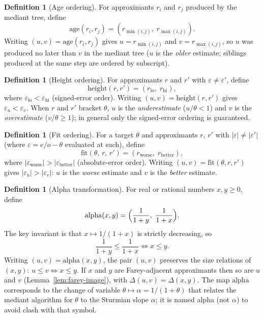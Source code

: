 \documentclass[12pt]{article}
\theoremstyle{definition}
\newtheorem{definition}[theorem]{Definition}
\theoremstyle{remark}
\theoremstyle{plain}
\newcommand{\eps}{\varepsilon}
\begin{document}
\begin{definition}[Age ordering]
\label{def:age}
For approximants $r_i$ and $r_j$ produced by the mediant tree, define
\[
  \mathrm{age}(r_i, r_j) = (r_{\min(i,j)},\; r_{\max(i,j)}).
\]
Writing $(u, v) = \mathrm{age}(r_i, r_j)$ gives $u = r_{\min(i,j)}$ and
$v = r_{\max(i,j)}$, so $u$ was produced no later than $v$ in the mediant tree
($u$ is the \emph{older} estimate; siblings produced at the same step are ordered
by subscript).
\end{definition}

\begin{definition}[Height ordering]
\label{def:height}
For approximants $r$ and $r'$ with $\eps \neq \eps'$, define
\[
  \mathrm{height}(r, r') = (r_{\mathrm{lo}},\; r_{\mathrm{hi}}),
\]
where $\eps_{\mathrm{lo}} < \eps_{\mathrm{hi}}$ (signed-error order).
Writing $(u, v) = \mathrm{height}(r, r')$ gives $\eps_u < \eps_v$.
When $r$ and $r'$ bracket $\theta$, $u$ is the \emph{underestimate}
($u/\theta < 1$) and $v$ is the \emph{overestimate} ($v/\theta \geq 1$);
in general only the signed-error ordering is guaranteed.
\end{definition}

\begin{definition}[Fit ordering]
\label{def:fit}
For a target $\theta$ and approximants $r$, $r'$ with $|\eps| \neq |\eps'|$
(where $\eps = e/o - \theta$ evaluated at each), define
\[
  \mathrm{fit}(\theta,\, r,\, r') = (r_{\mathrm{worse}},\; r_{\mathrm{better}}),
\]
where $|\eps_{\mathrm{worse}}| > |\eps_{\mathrm{better}}|$ (absolute-error order).
Writing $(u, v) = \mathrm{fit}(\theta, r, r')$ gives $|\eps_u| > |\eps_v|$:
$u$ is the \emph{worse} estimate and $v$ is the \emph{better} estimate.
\end{definition}

\begin{definition}[Alpha transformation]
\label{def:alpha-transform}
For real or rational numbers $x, y \geq 0$, define
\[
  \mathrm{alpha}(x, y) = \Bigl(\frac{1}{1+y},\; \frac{1}{1+x}\Bigr).
\]
The key invariant is that $x \mapsto 1/(1+x)$ is strictly decreasing, so
\[
  \frac{1}{1+y} \leq \frac{1}{1+x} \iff x \leq y.
\]
Writing $(u, v) = \mathrm{alpha}(x, y)$, the pair $(u, v)$ preserves the size
relations of $(x, y)$: $u \leq v \iff x \leq y$.
If $x$ and $y$ are Farey-adjacent approximants then so are $u$ and $v$
(Lemma~\ref{lem:farey-image}), with $\Delta(u, v) = \Delta(x, y)$.
The map $\mathrm{alpha}$ corresponds to the change of variable $\theta \mapsto \alpha = 1/(1+\theta)$
that relates the mediant algorithm for $\theta$ to the Sturmian slope $\alpha$;
it is named \textup{alpha} (not $\alpha$) to avoid clash with that symbol.
\end{definition}
\end{document}
